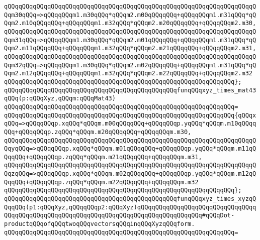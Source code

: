 \verb|qQQqqQQqqQQqqQQqqQQqqQQqqQQqqQQqqQQqqQQqqQQqqQQqqQQqqQQqqQQqqQQqqQQqqQQqm30qQQq=>qQQqqQQqm1.m30qQQq*qQQqm2.m00qQQqqQQq+qQQqqQQqm1.m31qQQq*qQQqm2.m10qQQqqQQq+qQQqqQQqm1.m32qQQq*qQQqm2.m20qQQqqQQq+qQQqqQQqm2.m30,|\newline
\verb|qQQqqQQqqQQqqQQqqQQqqQQqqQQqqQQqqQQqqQQqqQQqqQQqqQQqqQQqqQQqqQQqqQQqqQQqm31qQQq=>qQQqqQQqm1.m30qQQq*qQQqm2.m01qQQqqQQq+qQQqqQQqm1.m31qQQq*qQQqm2.m11qQQqqQQq+qQQqqQQqm1.m32qQQq*qQQqm2.m21qQQqqQQq+qQQqqQQqm2.m31,|\newline
\verb|qQQqqQQqqQQqqQQqqQQqqQQqqQQqqQQqqQQqqQQqqQQqqQQqqQQqqQQqqQQqqQQqqQQqqQQqm32qQQq=>qQQqqQQqm1.m30qQQq*qQQqm2.m02qQQqqQQq+qQQqqQQqm1.m31qQQq*qQQqm2.m12qQQqqQQq+qQQqqQQqm1.m32qQQq*qQQqm2.m22qQQqqQQq+qQQqqQQqm2.m32|\newline
\verb|qQQqqQQqqQQqqQQqqQQqqQQqqQQqqQQqqQQqqQQqqQQqqQQqqQQqqQQqqQQqqQQq};|\newline
\newline
\verb|qQQqqQQqqQQqqQQqqQQqqQQqqQQqqQQqqQQqqQQqqQQqqQQqfunqQQqxyz_times_mat43qQQq(p:qQQqXyz,qQQqm:qQQqMat43)|\newline
\verb|qQQqqQQqqQQqqQQqqQQqqQQqqQQqqQQqqQQqqQQqqQQqqQQqqQQqqQQqqQQqqQQq=|\newline
\verb|qQQqqQQqqQQqqQQqqQQqqQQqqQQqqQQqqQQqqQQqqQQqqQQqqQQqqQQqqQQqqQQq{qQQqxqQQq=>qQQqqQQqp.xqQQq*qQQqm.m00qQQqqQQq+qQQqqQQqp.yqQQq*qQQqm.m10qQQqqQQq+qQQqqQQqp.zqQQq*qQQqm.m20qQQqqQQq+qQQqqQQqm.m30,|\newline
\verb|qQQqqQQqqQQqqQQqqQQqqQQqqQQqqQQqqQQqqQQqqQQqqQQqqQQqqQQqqQQqqQQqqQQqqQQqyqQQq=>qQQqqQQqp.xqQQq*qQQqm.m01qQQqqQQq+qQQqqQQqp.yqQQq*qQQqm.m11qQQqqQQq+qQQqqQQqp.zqQQq*qQQqm.m21qQQqqQQq+qQQqqQQqm.m31,|\newline
\verb|qQQqqQQqqQQqqQQqqQQqqQQqqQQqqQQqqQQqqQQqqQQqqQQqqQQqqQQqqQQqqQQqqQQqqQQqzqQQq=>qQQqqQQqp.xqQQq*qQQqm.m02qQQqqQQq+qQQqqQQqp.yqQQq*qQQqm.m12qQQqqQQq+qQQqqQQqp.zqQQq*qQQqm.m22qQQqqQQq+qQQqqQQqm.m32|\newline
\verb|qQQqqQQqqQQqqQQqqQQqqQQqqQQqqQQqqQQqqQQqqQQqqQQqqQQqqQQqqQQqqQQq};|\newline
\newline
\verb|qQQqqQQqqQQqqQQqqQQqqQQqqQQqqQQqqQQqqQQqqQQqqQQqfunqQQqxyz_times_xyzqQQqqQQq(p1:qQQqXyz,qQQqqQQqp2:qQQqXyz)qQQqqQQqqQQqqQQqqQQqqQQqqQQqqQQqqQQqqQQqqQQqqQQqqQQqqQQqqQQqqQQqqQQqqQQqqQQqqQQqqQQqqQQq#qQQqDot-productqQQqofqQQqtwoqQQqvectorsqQQqinqQQqXyzqQQqform.|\newline
\verb|qQQqqQQqqQQqqQQqqQQqqQQqqQQqqQQqqQQqqQQqqQQqqQQqqQQqqQQqqQQqqQQq=|\newline
